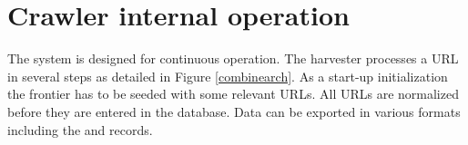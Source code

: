 \section{Crawler internal operation}
\label{operation}
The system is designed for continuous operation.
The harvester processes a URL in several steps as detailed
in Figure \ref{combinearch}.  As a start-up initialization the
frontier has to be seeded with some relevant URLs. All URLs are
normalized before they are entered in the database.
Data can be exported in various formats including the  and
 records.

\begin{figure}[htb]
\begin{center}

\end{center}
\end{figure}
